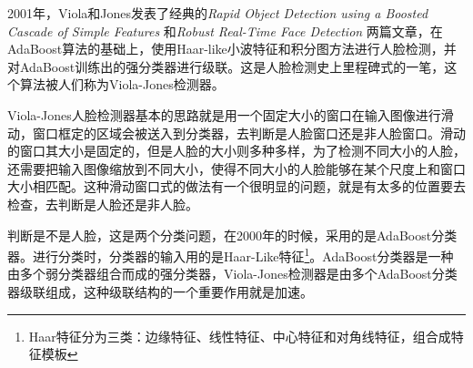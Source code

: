 2001年，Viola和Jones发表了经典的\textit{Rapid Object Detection using a Boosted Cascade of Simple Features} \cite{repid}和\textit{Robust Real-Time Face Detection} \cite{robust}两篇文章，在AdaBoost算法的基础上，使用Haar-like小波特征和积分图方法进行人脸检测，并对AdaBoost训练出的强分类器进行级联。这是人脸检测史上里程碑式的一笔，这个算法被人们称为Viola-Jones检测器。

Viola-Jones人脸检测器基本的思路就是用一个固定大小的窗口在输入图像进行滑动，窗口框定的区域会被送入到分类器，去判断是人脸窗口还是非人脸窗口。滑动的窗口其大小是固定的，但是人脸的大小则多种多样，为了检测不同大小的人脸，还需要把输入图像缩放到不同大小，使得不同大小的人脸能够在某个尺度上和窗口大小相匹配。这种滑动窗口式的做法有一个很明显的问题，就是有太多的位置要去检查，去判断是人脸还是非人脸。

判断是不是人脸，这是两个分类问题，在2000年的时候，采用的是AdaBoost分类器\cite{adaboost}。进行分类时，分类器的输入用的是Haar-Like特征\footnote{Haar特征分为三类：边缘特征、线性特征、中心特征和对角线特征，组合成特征模板}。AdaBoost分类器是一种由多个弱分类器组合而成的强分类器，Viola-Jones检测器是由多个AdaBoost分类器级联组成，这种级联结构的一个重要作用就是加速。